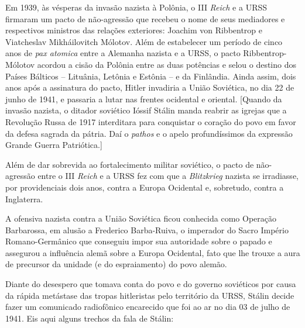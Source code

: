 Em 1939, às vésperas da invasão nazista à Polônia, o III \emph{Reich} e
a URSS firmaram um pacto de não-agressão que recebeu o nome de seus
mediadores e respectivos ministros das relações exteriores: Joachim von
Ribbentrop e Viatcheslav Mikháilovitch Mólotov. Além de estabelecer um
período de cinco anos de \emph{pax atomica} entre a Alemanha nazista e a
URSS, o pacto Ribbentrop-Mólotov acordou a cisão da Polônia entre as
duas potências e selou o destino dos Países Bálticos -- Lituânia,
Letônia e Estônia -- e da Finlândia. Ainda assim, dois anos após a
assinatura do pacto, Hitler invadiria a União Soviética, no dia 22 de
junho de 1941, e passaria a lutar nas frentes ocidental e oriental.
{[}Quando da invasão nazista, o ditador soviético Ióssif Stálin manda
reabrir as igrejas que a Revolução Russa de 1917 interditara para
conquistar o coração do povo em favor da defesa sagrada da pátria. Daí o
\emph{pathos} e o apelo profundíssimos da expressão Grande Guerra
Patriótica.{]}

Além de dar sobrevida ao fortalecimento militar soviético, o pacto de
não-agressão entre o III \emph{Reich} e a URSS fez com que a
\emph{Blitzkrieg} nazista se irradiasse, por providenciais dois anos,
contra a Europa Ocidental e, sobretudo, contra a Inglaterra.

A ofensiva nazista contra a União Soviética ficou conhecida como
Operação Barbarossa, em alusão a Frederico Barba-Ruiva, o imperador do
Sacro Império Romano-Germânico que conseguiu impor sua autoridade sobre
o papado e assegurou a influência alemã sobre a Europa Ocidental, fato
que lhe trouxe a aura de precursor da unidade (e do espraiamento) do
povo alemão.

Diante do desespero que tomava conta do povo e do governo soviéticos por
causa da rápida metástase das tropas hitleristas pelo território da
URSS, Stálin decide fazer um comunicado radiofônico encarecido que foi
ao ar no dia 03 de julho de 1941. Eis aqui alguns trechos da fala de
Stálin:

